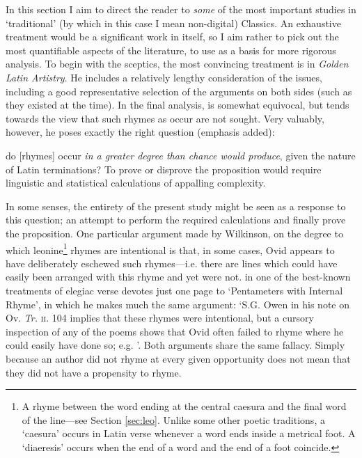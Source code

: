 \documentclass[twocolumn, switch, a4paper]{article} %
\begin{document}
In this section I aim to direct the reader to \emph{some} of the most
important studies in `traditional' (by which in this case I mean non-digital)
Classics. An exhaustive treatment would be a significant work in itself, so I
aim rather to pick out the most quantifiable aspects of the literature, to use
as a basis for more rigorous analysis. To begin with the sceptics, the most
convincing treatment is  in \emph{Golden Latin
Artistry}. He includes a relatively lengthy consideration of the issues,
including a good representative selection of the arguments on both sides (such
as they existed at the time). In the final analysis,  is somewhat equivocal, but tends towards the view
that such rhymes as occur are not sought. Very valuably, however, he poses
exactly the right question (emphasis added):

\begin{adjustwidth}{0.1\linewidth}{0.1\linewidth}
  \footnotesize
  do [rhymes] occur \emph{in a greater
    degree than chance would produce}, given the nature of Latin terminations? To
  prove or disprove the proposition would require linguistic and statistical
  calculations of appalling complexity.
\end{adjustwidth}
In some senses, the entirety of the present study might be seen as a response
to this question; an attempt to perform the required calculations and finally
prove the proposition. One particular argument made by Wilkinson, on the
degree to which leonine\footnote{
  A rhyme between the word ending at the central caesura and the final word of
  the line---see Section \ref{sec:leo}. Unlike some other poetic traditions, a
  `caesura' occurs in Latin verse whenever a word ends inside a metrical foot.
  A `diaeresis' occurs when the end of a word and the end of a foot coincide.
}
rhymes are intentional is that, in some cases, Ovid appears to have
deliberately eschewed such rhymes---i.e. there are lines which could have
easily been arranged with this rhyme and yet were not.
 in one of the best-known treatments of
elegiac verse devotes just one page to `Pentameters with Internal Rhyme', in
which he makes much the same argument: `S.G. Owen in his note on Ov.
\emph{Tr.} \textsc{ii}. 104 implies that these rhymes were intentional, but a
cursory inspection of any of the poems shows that Ovid often failed to rhyme
where he could easily have done so; e.g. \textellipsis'. Both arguments share
the same fallacy. Simply because an author did not rhyme at every given
opportunity does not mean that they did not have a propensity to rhyme.
\end{document}

